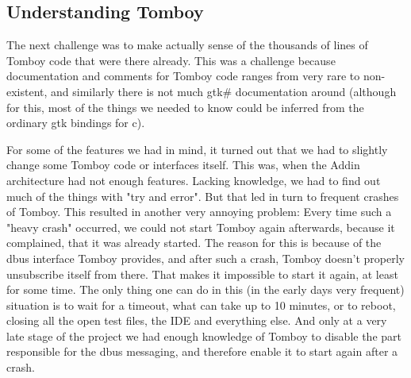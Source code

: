 \subsection{Understanding Tomboy}
\label{understanding_tomboy}
The next challenge was to make actually sense of the thousands of lines of Tomboy code that were there already. This was a challenge because documentation and comments for Tomboy code ranges from very rare to non-existent, and similarly there is not much gtk\# documentation around (although for this, most of the things we needed to know could be inferred from the ordinary gtk bindings for c).

For some of the features we had in mind, it turned out that we had to slightly change some Tomboy code or interfaces itself. This was, when the Addin architecture had not enough features. Lacking knowledge, we had to find out much of the things with "try and error". But that led in turn to frequent crashes of Tomboy. This resulted in another very annoying problem: Every time such a "heavy crash" occurred, we could not start Tomboy again afterwards, because it complained, that it was already started. The reason for this is because of the dbus interface Tomboy provides, and after such a crash, Tomboy doesn't properly unsubscribe itself from there. That makes it impossible to start it again, at least for some time. The only thing one can do in this (in the early days very frequent) situation is to wait for a timeout, what can take up to 10 minutes, or to reboot, closing all the open test files, the IDE and everything else. And only at a very late stage of the project we had enough knowledge of Tomboy to disable the part responsible for the dbus messaging, and therefore enable it to start again after a crash.
